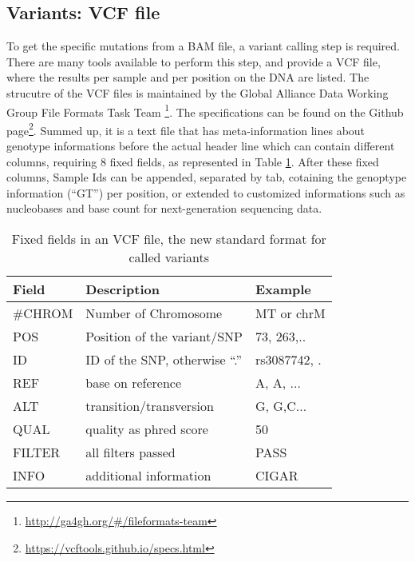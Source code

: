 \subsection{Variants: VCF file}\label{intro:VCF}
To get the specific mutations from a BAM file, a variant calling step is required. There are many tools available to perform this step, and provide a VCF file, where the results per sample and per position on the DNA are listed. The strucutre of the VCF files is maintained by the Global Alliance Data Working Group File Formats Task Team \footnote{\url{http://ga4gh.org/\#/fileformats-team}}. The specifications can be found on the Github page\footnote{\url{https://vcftools.github.io/specs.html}}. Summed up, it is a text file that has meta-information lines about genotype informations before the actual header line which can contain different columns, requiring 8 fixed fields, as represented in Table \ref{table:vcf}. After these fixed columns, Sample Ids can be appended, separated by tab, cotaining the genoptype information ("`GT"') per position, or extended to customized informations such as nucleobases and base count for next-generation sequencing data.

\begin{table}[H]
  \begin{tabular}{lll}
    \toprule
    Field & Description & Example \\
		\midrule
    \#CHROM & Number of Chromosome & MT or chrM \\
    POS & Position of the variant/SNP & 73, 263,.. \\
    ID & ID of the SNP, otherwise "`."' & rs3087742, .\\
    REF & base on reference & A, A, ...\\
    ALT & transition/transversion & G, G,C...\\
    QUAL & quality as phred score & 50 \\
    FILTER & all filters passed & PASS \\
    INFO & additional information & CIGAR \\
		\bottomrule
\end{tabular}
\caption{Fixed fields in an VCF file, the new standard format for called variants}
\label{table:vcf}
\end{table}